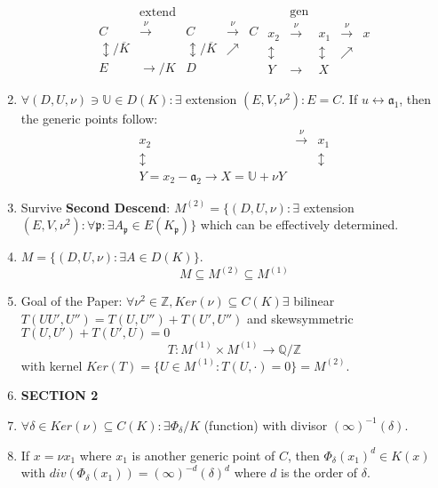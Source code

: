 \documentclass{article}
\newcommand{\Q}{\mathbb{Q}}
\newcommand{\Z}{\mathbb{Z}}
\newcommand{\af}{\mathfrak{a}}
\newcommand{\pp}{\mathfrak{p}}
\newcommand{\ra}{\rightarrow}
\newcommand{\lra}{\leftrightarrow}
\newcommand{\raa}[1]{\overset{#1}{\longrightarrow}}
\newcommand{\ACK}{\overline{K}}
\begin{document}
\begin{multicols}{2}
\begin{enumerate}
\[ \begin{array}{lllll} & \textrm{extend}\\ C & \raa{\nu} & C & \raa{\nu} & C \\\updownarrow/\ACK & & \updownarrow/\ACK & \nearrow \\ E & \ra/K & D \end{array}  \begin{array}{lllll} & \textrm{gen} \\ x_2 & \raa{\nu} & x_1 & \raa{\nu} & x \\\updownarrow & & \updownarrow & \nearrow \\ Y & \ra & X \end{array} 
\]

\item $\forall (D,U,\nu) \ni \mathbb{U} \in D(K): \exists$ extension $(E,V,\nu^2): E = C$. 
If $u \lra \af_1$, then the generic points follow:
\[\begin{array}{lll} x_2 & \raa{\nu} & x_1 \\ \updownarrow && \updownarrow\\
Y = x_2 - \af_2 \ra X = \mathbb{U} + \nu Y\end{array}\]

\item Survive \textbf{Second Descend}: $M^{(2)} = \{(D,U,\nu): \exists$ extension $(E,V,\nu^2): \forall \pp: \exists A_\pp \in E(K_\pp)\}$ which can be effectively determined. 

\item $M = \{(D,U,\nu): \exists A \in D(K)\}$.
\[M \subseteq M^{(2)} \subseteq M^{(1)}\]

\item Goal of the Paper: $\forall \nu^2 \in \Z, Ker(\nu) \subseteq C(K) \exists$ bilinear $T(UU',U'') = T(U,U'') + T(U',U'')$ and skewsymmetric $T(U,U') + T(U',U) = 0$
\[T: M^{(1)} \times M^{(1)} \ra \Q/\Z\]
with kernel $Ker(T) = \{U \in M^{(1)}: T(U,\cdot) = 0\} = M^{(2)}$. 

\item \textbf{SECTION 2}
\item $\forall \delta \in Ker(\nu) \subseteq C(K): \exists \Phi_\delta/K$ (function) with divisor $(\infty)^{-1}(\delta)$.

\item If $x = \nu x_1$ where $x_1$ is another generic point of $C$, then $\Phi_\delta(x_1)^d \in K(x)$ with $div(\Phi_\delta(x_1)) = (\infty)^{-d}(\delta)^d$ where $d$ is the order of $\delta$.


\end{enumerate}
\end{multicols}
\end{document}
